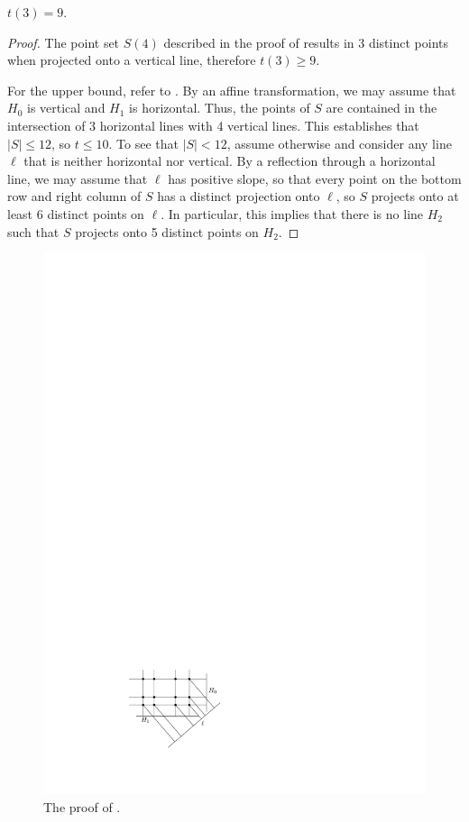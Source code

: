 \documentclass{cccg10}
\begin{document}
\begin{lem}
$t(3)=9$.
\end{lem}

\begin{proof}
The point set $S(4)$ described in the proof of 
results in 3 distinct points when projected onto a vertical line, therefore
$t(3)\ge 9$.

For the upper bound, refer to .  By an affine transformation,
we may assume that $H_0$ is vertical and $H_1$ is horizontal.  Thus, the
points of $S$ are contained in the intersection of 3 horizontal lines
with 4 vertical lines.  This establishes that $|S|\le 12$, so $t \le 10$.
To see that $|S|< 12$, assume otherwise and consider any line $\ell$ that
is neither horizontal nor vertical. By a reflection through a horizontal
line, we may assume that $\ell$ has positive slope, so that every point
on the bottom row and right column of $S$ has a distinct projection
onto $\ell$, so $S$ projects onto at least 6 distinct points on $\ell$.
In particular, this implies that there is no line $H_2$ such that $S$
projects onto 5 distinct points on $H_2$.
\end{proof}
\begin{figure}
  \begin{center}
    \includegraphics{3opt}
  \end{center}
  \caption{The proof of .}
\end{figure}
\end{document}
